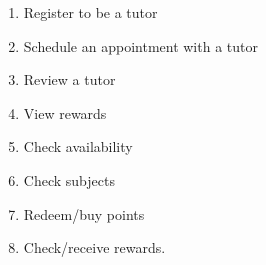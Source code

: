 \begin{enumerate}
\item Register to be a tutor
\item Schedule an appointment with a tutor
\item Review a tutor
\item View rewards
\item Check availability
\item Check subjects
\item Redeem/buy points
\item Check/receive rewards.
\end{enumerate}

